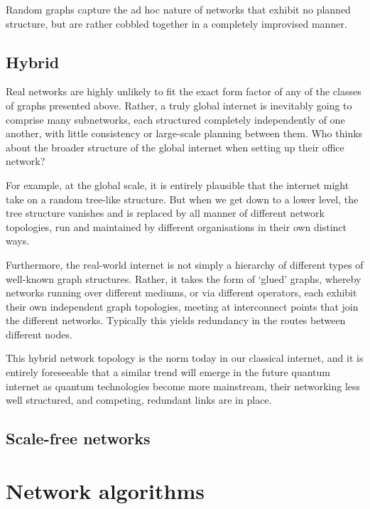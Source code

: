 \documentclass[aps,rmp,twocolumn,amsmath,amssymb,nofootinbib,superscriptaddress,longbibliography,floatfix]{revtex4-1}
\newcommand{\comment}[1]{{\color{blue}{\textbf{#1}}}}
\begin{document}
Random graphs capture the ad hoc nature of networks that exhibit no planned structure, but are rather cobbled together in a completely improvised manner.

%
%

\subsection{Hybrid}

Real networks are highly unlikely to fit the exact form factor of any of the classes of graphs presented above. Rather, a truly global internet is inevitably going to comprise many subnetworks, each structured completely independently of one another, with little consistency or large-scale planning between them. Who thinks about the broader structure of the global internet when setting up their office network?

For example, at the global scale, it is entirely plausible that the internet might take on a random tree-like structure. But when we get down to a lower level, the tree structure vanishes and is replaced by all manner of different network topologies, run and maintained by different organisations in their own distinct ways.

Furthermore, the real-world internet is not simply a hierarchy of different types of well-known graph structures. Rather, it takes the form of `glued' graphs, whereby networks running over different mediums, or via different operators, each exhibit their own independent graph topologies, meeting at interconnect points that join the different networks. Typically this yields redundancy in the routes between different nodes.

This hybrid network topology is the norm today in our classical internet, and it is entirely foreseeable that a similar trend will emerge in the future quantum internet as quantum technologies become more mainstream, their networking less well structured, and competing, redundant links are in place.

%
%

\subsection{Scale-free networks}

\comment{To do}

%
%

\section{Network algorithms} \label{sec:graph_theory}
\end{document}
